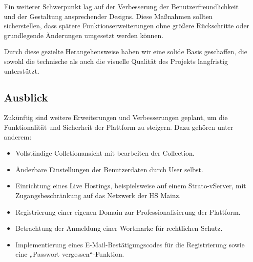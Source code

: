 Ein weiterer Schwerpunkt lag auf der Verbesserung der Benutzerfreundlichkeit und der Gestaltung ansprechender Designs.
Diese Maßnahmen sollten sicherstellen, dass spätere Funktionserweiterungen ohne größere Rückschritte oder grundlegende Änderungen umgesetzt werden können.

Durch diese gezielte Herangehensweise haben wir eine solide Basis geschaffen, die sowohl die technische als auch die visuelle Qualität des Projekts langfristig unterstützt.

\subsection{Ausblick}\label{subsec:ausblick-zukuenftige-ziele-und-funktionen}

Zukünftig sind weitere Erweiterungen und Verbesserungen geplant, um die Funktionalität und Sicherheit der Plattform zu steigern.
Dazu gehören unter anderem:

\begin{itemize}[noitemsep]
    \item Vollständige Colletionansicht mit bearbeiten der Collection.
    \item Änderbare Einstellungen der Benutzerdaten durch User selbst.
    \item Einrichtung eines Live Hostings, beispielsweise auf einem Strato-vServer, mit Zugangsbeschränkung auf das Netzwerk der HS Mainz.
    \item Registrierung einer eigenen Domain zur Professionalisierung der Plattform.
    \item Betrachtung der Anmeldung einer Wortmarke für rechtlichen Schutz.
    \item Implementierung eines E-Mail-Bestätigungscodes für die Registrierung sowie eine „Passwort vergessen“-Funktion.
\end{itemize}


